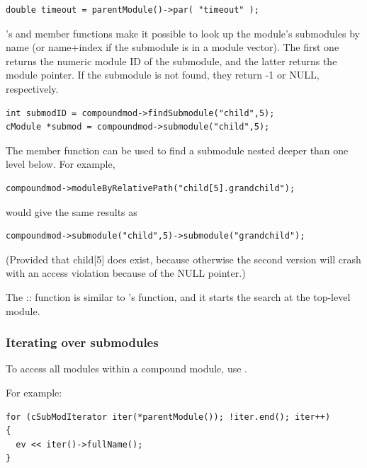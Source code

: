 \begin{verbatim}
double timeout = parentModule()->par( "timeout" );
\end{verbatim}


's  and 
member functions make it possible to look up the module's submodules
by name (or name+index if the submodule
is in a module vector). The first one returns the numeric module ID of
the submodule, and the latter returns the module pointer.  If the
submodule is not found, they return -1 or NULL, respectively.

\begin{verbatim}
int submodID = compoundmod->findSubmodule("child",5);
cModule *submod = compoundmod->submodule("child",5);
\end{verbatim}


The  member function can be used to find
a submodule nested deeper than one level below. For example,

\begin{verbatim}
compoundmod->moduleByRelativePath("child[5].grandchild");
\end{verbatim}

would give the same results as

\begin{verbatim}
compoundmod->submodule("child",5)->submodule("grandchild");
\end{verbatim}

(Provided that child[5] does exist, because otherwise the second
version will crash with an access violation because of the NULL
pointer.)


The :: function is similar
to 's  function, and it
starts the search at the top-level module.


\subsubsection{Iterating over submodules}


To access all modules within a compound module,
use .

For example:

\begin{verbatim}
for (cSubModIterator iter(*parentModule()); !iter.end(); iter++)
{
  ev << iter()->fullName();
}
\end{verbatim}


